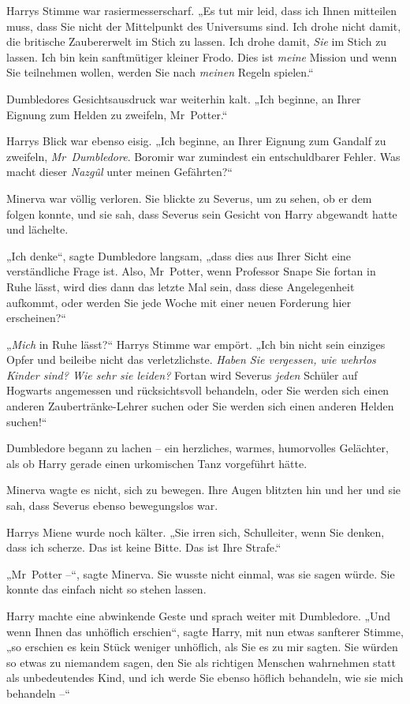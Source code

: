{Harrys Stimme war rasiermesserscharf. „Es tut mir leid, dass ich Ihnen mitteilen muss, dass Sie nicht der Mittelpunkt des Universums sind. Ich drohe nicht damit, die britische Zaubererwelt im Stich zu lassen. Ich drohe damit, \emph{Sie} im Stich zu lassen. Ich bin kein sanftmütiger kleiner Frodo. Dies ist \emph{meine} Mission und wenn Sie teilnehmen wollen, werden Sie nach \emph{meinen} Regeln spielen.“

Dumbledores Gesichtsausdruck war weiterhin kalt. „Ich beginne, an Ihrer Eignung zum Helden zu zweifeln, Mr~Potter.“

Harrys Blick war ebenso eisig. „Ich beginne, an Ihrer Eignung zum Gandalf zu zweifeln, \emph{Mr~Dumbledore}. Boromir war zumindest ein entschuldbarer Fehler. Was macht dieser \emph{Nazgûl} unter meinen Gefährten?“

Minerva war völlig verloren. Sie blickte zu Severus, um zu sehen, ob er dem folgen konnte, und sie sah, dass Severus sein Gesicht von Harry abgewandt hatte und lächelte.

„Ich denke“, sagte Dumbledore langsam, „dass dies aus Ihrer Sicht eine verständliche Frage ist. Also, Mr~Potter, wenn Professor Snape Sie fortan in Ruhe lässt, wird dies dann das letzte Mal sein, dass diese Angelegenheit aufkommt, oder werden Sie jede Woche mit einer neuen Forderung hier erscheinen?“

„\emph{Mich} in Ruhe lässt?“ Harrys Stimme war empört. „Ich bin nicht sein einziges Opfer und beileibe nicht das verletzlichste. \emph{Haben Sie vergessen, wie wehrlos Kinder sind? Wie sehr sie leiden?} Fortan wird Severus \emph{jeden} Schüler auf Hogwarts angemessen und rücksichtsvoll behandeln, oder Sie werden sich einen anderen Zaubertränke-Lehrer suchen oder Sie werden sich einen anderen Helden suchen!“

Dumbledore begann zu lachen -- ein herzliches, warmes, humorvolles Gelächter, als ob Harry gerade einen urkomischen Tanz vorgeführt hätte.

Minerva wagte es nicht, sich zu bewegen. Ihre Augen blitzten hin und her und sie sah, dass Severus ebenso bewegungslos war.

Harrys Miene wurde noch kälter. „Sie irren sich, Schulleiter, wenn Sie denken, dass ich scherze. Das ist keine Bitte. Das ist Ihre Strafe.“

„Mr~Potter --“, sagte Minerva. Sie wusste nicht einmal, was sie sagen würde. Sie konnte das einfach nicht so stehen lassen.

Harry machte eine abwinkende Geste und sprach weiter mit Dumbledore. „Und wenn Ihnen das unhöflich erschien“, sagte Harry, mit nun etwas sanfterer Stimme, „so erschien es kein Stück weniger unhöflich, als Sie es zu mir sagten. Sie würden so etwas zu niemandem sagen, den Sie als richtigen Menschen wahrnehmen statt als unbedeutendes Kind, und ich werde Sie ebenso höflich behandeln, wie sie mich behandeln --“

}
